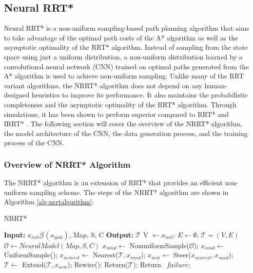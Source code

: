 \documentclass{article}
\begin{document}
\subsection{Neural RRT*}
Neural RRT* is a non-uniform sampling-based path planning algorithm that aims to take advantage of the optimal path costs of the A* algorithm as well as the asymptotic optimality of the RRT* algorithm. Instead of sampling from the state space using just a uniform distribution, a non-uniform distribution learned by a convolutional neural network (CNN) trained on optimal paths generated from the A* algorithm is used to achieve non-uniform sampling. Unlike many of the RRT variant algorithms, the NRRT* algorithm does not depend on any human-designed heuristics to improve its performance. It also maintains the probabilistic completeness and the asymptotic optimality of the RRT* algorithm. Through simulations, it has been shown to perform superior compared to RRT* and IRRT* \cite{nrrt}. The following section will cover the overview of the NRRT* algorithm, the model architecture of the CNN, the data generation process, and the training process of the CNN.

\subsubsection{Overview of NRRT* Algorithm}
The NRRT* algorithm is an extension of RRT* that provides an efficient non-uniform sampling scheme. The steps of the NRRT* algorithm are shown in Algorithm \ref{alg:nrrtalgorithm}:
\begin{algorithm}
\caption{NRRT*}\label{alg:nrrtalgorithm}
    \begin{algorithmic}[1]
    \State \textbf{Input: }  $x_{init} \mathcal{G}(x_{goal})$, Map, S, C
    \State \textbf{Output: } $\mathcal{T}$
    \State V $\leftarrow x_{init}$; \quad $E \leftarrow \emptyset$; \quad ${\mathcal{T}} = (V, E)$ 
    \State $\mathcal{O} \leftarrow NeuralModel(Map, S, C)$
            \State $x_{rand} \leftarrow$ NonuniformSample($\mathcal{O}$);
        \Else
            \State $x_{rand} \leftarrow$ UniformSample();
        \EndIf
        \State $x_{nearest} \leftarrow$ Nearest($\mathcal{T}, x_{rand}$);
        \State $x_{new} \leftarrow$ Steer($x_{nearest}, x_{rand}$);
            \State $\mathcal{T} \leftarrow$ Extend($\mathcal{T}, x_{new}$);
            \State Rewire();
                \State Return($\mathcal{T}$);
            \EndIf
        \EndIf
    \EndFor
    \State Return \, $failure$;
  \end{algorithmic}
\end{algorithm}
\end{document}

